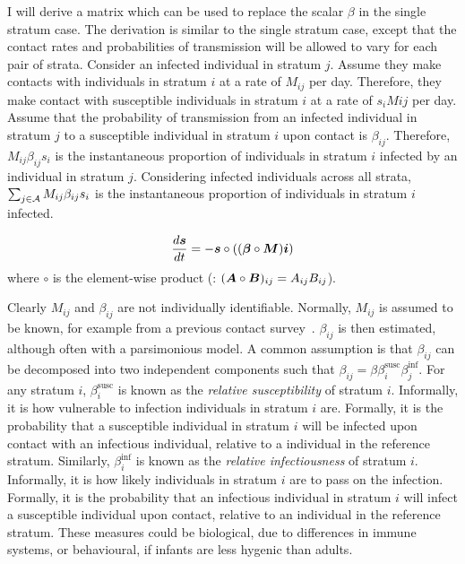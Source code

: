 \documentclass[thesis.tex]{subfiles}
\begin{document}
I will derive a matrix which can be used to replace the scalar $\beta$ in the single stratum case.
The derivation is similar to the single stratum case, except that the contact rates and probabilities of transmission will be allowed to vary for each pair of strata.
Consider an infected individual in stratum $j$.
Assume they make contacts with individuals in stratum $i$ at a rate of $M_{ij}$ per day.
Therefore, they make contact with susceptible individuals in stratum $i$ at a rate of $s_i M{ij}$ per day.
Assume that the probability of transmission from an infected individual in stratum $j$ to a susceptible individual in stratum $i$ upon contact is $\beta_{ij}$.
Therefore, $M_{ij} \beta_{ij} s_i$ is the instantaneous proportion of individuals in stratum $i$ infected by an individual in stratum $j$.
Considering infected individuals across all strata, $\sum_{j \in \mathcal{A}} M_{ij} \beta_{ij} s_i$ is the instantaneous proportion of individuals in stratum $i$ infected.

\begin{align}
    \frac{d\bm{s}}{dt} = -\bm{s} \circ ((\bm{\beta} \circ \bm{M}) \bm{i})
    \label{eq:matrix:theory}
\end{align}
where $\circ$ is the element-wise product (\ie: $(\bm{A} \circ \bm{B})_{ij} = A_{ij} B_{ij}$).

Clearly $M_{ij}$ and $\beta_{ij}$ are not individually identifiable.
Normally, $M_{ij}$ is assumed to be known, for example from a previous contact survey~\autocite[such as][]{mossongSocial}.
$\beta_{ij}$ is then estimated, although often with a parsimonious model.
A common assumption is that $\beta_{ij}$ can be decomposed into two independent components such that $\beta_{ij} = \beta \beta^\text{susc}_{i} \beta^\text{inf}_j$.
For any stratum $i$, $\beta^\text{susc}_i$ is known as the \emph{relative susceptibility} of stratum $i$.
Informally, it is how vulnerable to infection individuals in stratum $i$ are.
Formally, it is the probability that a susceptible individual in stratum $i$ will be infected upon contact with an infectious individual, relative to a individual in the reference stratum.
Similarly, $\beta^\text{inf}_i$ is known as the \emph{relative infectiousness} of stratum $i$.
Informally, it is how likely individuals in stratum $i$ are to pass on the infection.
Formally, it is the probability that an infectious individual in stratum $i$ will infect a susceptible individual upon contact, relative to an individual in the reference stratum.
These measures could be biological, \eg due to differences in immune systems, or behavioural, \eg if infants are less hygenic than adults.
\end{document}
